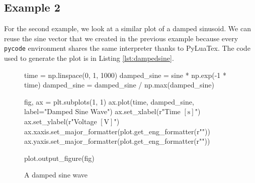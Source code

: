 \begin{listing}
  \caption{The code that generates the plot in Fig.
  \ref{fig:sine}}\label{lst:sine}
  \pytypeset
\end{listing}

\subsection{Example 2}

For the second example, we look at a similar plot of a damped sinusoid. We can
reuse the sine vector that we created in the previous example because every
\texttt{pycode} environment shares the same interpreter thanks to
PyLuaTex. The code used to generate the plot is in Listing \ref{lst:dampedsine}.

\begin{figure}[!ht]
  \begin{pycode}
    time = np.linspace(0, 1, 1000)
    damped_sine = sine * np.exp(-1 * time)
    damped_sine = damped_sine / np.max(damped_sine)

    fig, ax = plt.subplots(1, 1)
    ax.plot(time, damped_sine, label="Damped Sine Wave")
    ax.set_xlabel(r"Time $\left[\unit{\second}\right]$")
    ax.set_ylabel(r"Voltage $\left[\unit{\volt}\right]$")
    ax.xaxis.set_major_formatter(plot.get_eng_formatter(r"\second"))
    ax.yaxis.set_major_formatter(plot.get_eng_formatter(r"\volt"))

    plot.output_figure(fig)
  \end{pycode}
  \caption{A damped sine wave}\label{fig:dampedsine}
\end{figure}

\begin{listing}
  \caption{The code that generates the plot in
  Fig.\ref{fig:dampedsine}}\label{lst:dampedsine}
  \pytypeset
\end{listing}

\printbibliography%


